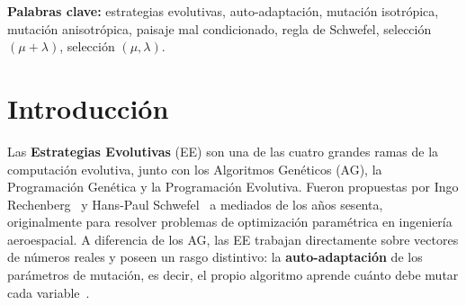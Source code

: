 \documentclass[12pt,letterpaper]{article}
\begin{document}
\begin{abstract}
\noindent
Se implementa desde cero un motor de \textbf{Estrategias Evolutivas} (EE) con auto-adaptación \textit{isotrópica} (un único parámetro $\sigma$) y \textit{anisotrópica} (un vector $\boldsymbol{\sigma}\in\mathbb{R}^{D}$) y dos esquemas de selección, $(\mu+\lambda)$ elitista y $(\mu,\lambda)$ con reemplazo total. Las cuatro variantes se evalúan sobre la función \textit{Elipsoide Invertido} en $D=10$, un paisaje mal condicionado donde cada dimensión tiene una escala propia. Se ejecutan 30~corridas independientes por variante (120~ejecuciones totales) con $\mu=20$, $\lambda=100$ y 500 generaciones. Todas las variantes alcanzan el óptimo $f(\mathbf{x}^{*})=1$ con tasa de éxito del 100\,\%, pero difieren significativamente en velocidad: las variantes isotrópicas cruzan el umbral $f\geq 0.95$ en una mediana de $\approx 22$--24 generaciones frente a $\approx 32$--39 generaciones de las anisotrópicas. La mecánica de auto-adaptación anisotrópica ajusta correctamente los $\sigma_i$ hacia la escala teórica $\sigma_i\propto\sqrt{i}$, confirmando el efecto predicho por la teoría de Schwefel; sin embargo, el coste de adaptar $D$ parámetros se impone sobre el beneficio cuando el número de condición del paisaje es moderado. Los resultados se publican también en un sitio interactivo Nuxt~3 con gráficas dinámicas.
\end{abstract}

\vspace{0.5em}
\noindent\textbf{Palabras clave:} estrategias evolutivas, auto-adaptación, mutación isotrópica, mutación anisotrópica, paisaje mal condicionado, regla de Schwefel, selección $(\mu+\lambda)$, selección $(\mu,\lambda)$.

\newpage
\tableofcontents
\listoffigures
\listoftables

\newpage
\section{Introducción}

Las \textbf{Estrategias Evolutivas} (EE) son una de las cuatro grandes ramas de la computación evolutiva, junto con los Algoritmos Genéticos (AG), la Programación Genética y la Programación Evolutiva. Fueron propuestas por Ingo Rechenberg~\cite{rechenberg1973} y Hans-Paul Schwefel~\cite{schwefel1995} a mediados de los años sesenta, originalmente para resolver problemas de optimización paramétrica en ingeniería aeroespacial. A diferencia de los AG, las EE trabajan directamente sobre vectores de números reales y poseen un rasgo distintivo: la \textbf{auto-adaptación} de los parámetros de mutación, es decir, el propio algoritmo aprende cuánto debe mutar cada variable~\cite{beyer2002,beyer1995}.
\end{document}
